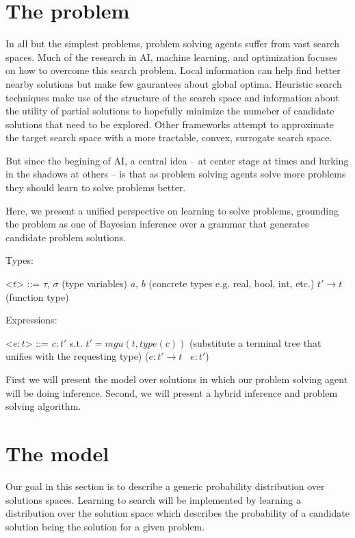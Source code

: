\documentclass{article}
\newcommand{\funtype}[2]{#1 \rightarrow #2}
\newcommand{\typedexp}[2]{#1 : #2}
\newcommand{\type}[1]{type(#1)}
\begin{document}
\newcommand{\learner}{\emph{Learner }}
\newcommand{\evaluator}{\emph{Evaluator }}
\section{The problem}
In all but the simplest problems, problem solving agents suffer from vast
search spaces. Much of the research in AI, machine learning, and optimization
focuses on how to overcome this search problem. Local information can help find
better nearby solutions but make few gaurantees about global optima. Heuristic
search techniques make use of the structure of the search space and information
about the utility of partial solutions to hopefully minimize the numeber of
candidate solutions that need to be explored. Other frameworks attempt to
approximate the target search space with a more tractable, convex, surrogate
search space. 

But since the begining of AI, a central idea -- at center stage at times and
lurking in the shadows at others -- is that as problem solving agents solve
more problems they should learn to solve problems better.

Here, we present a unified perspective on learning to solve problems, grounding the
problem as one of Bayesian inference over a grammar that generates candidate
problem solutions. 


Types:

\begin{grammar}
<$t$> ::= $\tau$, $\sigma$  (type variables)
  \alt $a$, $b$ (concrete types e.g. real, bool, int, etc.)
  \alt $\funtype{t'}{t}$ (function type)
\end{grammar}


Expressions: 
\begin{grammar}
<$\typedexp{e}{t}$> ::= $\typedexp{c}{t'}$ s.t. $t' = mgu(t,
\type{c})$ (substitute a terminal tree that unifies with the requesting type)
  \alt ($\typedexp{e}{\funtype{t'}{t}} \;\;\; \typedexp{e}{t'}$)
\end{grammar}




First we will present the model over solutions in which our problem solving
agent will be doing inference. Second, we will present a hybrid inference and
problem solving algorithm. 

\section{The model}
Our goal in this section is to describe a generic probability distribution over
solutions spaces. Learning to search will be implemented by learning a
distribution over the solution space which describes the probability of a 
candidate solution being the solution for a given problem. 
\end{document}
